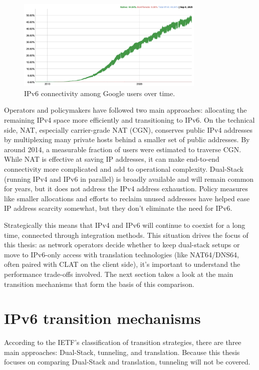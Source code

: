 \begin{figure}[H]
    \centering
    \caption{IPv6 connectivity among Google users over time\cite{google_ipv6_statistics}.}
    \label{fig:ipv6_google_adoption}
    \includegraphics[width=0.8\textwidth]{resources/images/ipv6google}
\end{figure}

Operators and policymakers have followed two main approaches: allocating the remaining IPv4 space more efficiently and transitioning to IPv6\cite{LEVIN20141059}. On the technical side, NAT, especially carrier-grade NAT (CGN), conserves public IPv4 addresses by multiplexing many private hosts behind a smaller set of public addresses\cite{rfc2663}. By around 2014, a measurable fraction of users were estimated to traverse CGN\cite{livadariu2018inferring}. While NAT is effective at saving IP addresses, it can make end-to-end connectivity more complicated and add to operational complexity\cite{rfc2993}. 
Dual-Stack (running IPv4 and IPv6 in parallel) is broadly available and will remain common for years, but it does not address the IPv4 address exhaustion\cite{LEVIN20141059}. Policy measures like smaller allocations and efforts to reclaim unused addresses have helped ease IP address scarcity somewhat, but they don't eliminate the need for IPv6\cite{LEVIN20141059}.

Strategically this means that IPv4 and IPv6 will continue to coexist for a long time, connected through integration methods\cite{7737362,LEVIN20141059}. This situation drives the focus of this thesis: as network operators decide whether to keep dual-stack setups or move to IPv6-only access with translation technologies (like NAT64/DNS64, often paired with CLAT on the client side), it's important to understand the performance trade-offs involved. The next section takes a look at the main transition mechanisms that form the basis of this comparison\cite{7737362,LEVIN20141059}.

\section{IPv6 transition mechanisms}
According to the IETF’s classification of transition strategies, there are three main approaches: 
Dual-Stack, tunneling, and translation\cite{rfc2893}. Because this thesis focuses on comparing Dual-Stack and translation, tunneling will not be covered. 

